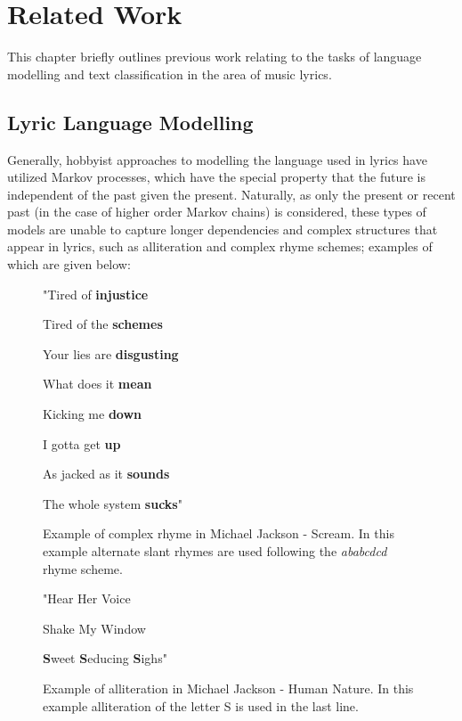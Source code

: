 \chapter{Related Work}
\label{chap:related_work}
This chapter briefly outlines previous work relating to the tasks of language modelling and text classification in the area of music lyrics.

\section{Lyric Language Modelling}
Generally, hobbyist approaches to modelling the language used in lyrics have utilized Markov processes, which have the special property that the future is independent of the past given the present. Naturally, as only the present or recent past (in the case of higher order Markov chains) is considered, these types of models are unable to capture longer dependencies and complex structures that appear in lyrics, such as alliteration and complex rhyme schemes; examples of which are given below:

\begin{figure}[ht]
	\begin{center}
		"Tired of \textbf{injustice}
		\par
		Tired of the \textbf{schemes}
		\par
		Your lies are \textbf{disgusting}
		\par
		What does it \textbf{mean}
		\par
		Kicking me \textbf{down}
		\par
		I gotta get \textbf{up}
		\par
		As jacked as it \textbf{sounds}
		\par
		The whole system \textbf{sucks}"
	\end{center}
	\caption[Example of complex rhyme in Michael Jackson - Scream]{Example of complex rhyme in Michael Jackson - Scream. In this example alternate slant rhymes are used following the \textit{ababcdcd} rhyme scheme.}
\end{figure}

\begin{figure}[ht]
	\begin{center}
		"Hear Her Voice
		\par
		Shake My Window
		\par
		\textbf{S}weet \textbf{S}educing \textbf{S}ighs"
	\end{center}
	\caption[Example of alliteration in Michael Jackson - Human Nature]{Example of alliteration in Michael Jackson - Human Nature. In this example alliteration of the letter S is used in the last line.}
\end{figure}




